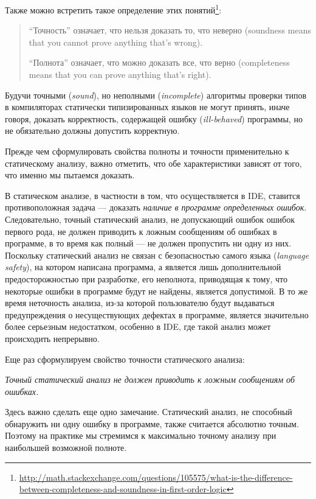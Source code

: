 Также можно встретить такое определение этих
понятий\footnote{\url{http://math.stackexchange.com/questions/105575/what-is-the-difference-between-completeness-and-soundness-in-first-order-logic}}:

\begin{quote}
``Точность'' означает, что нельзя доказать то, что неверно (soundness means that
you cannot prove anything that's wrong).

``Полнота'' означает, что можно доказать все, что верно (completeness means that
you can prove anything that's right).
\end{quote}

Будучи точными (\emph{sound}), но неполными (\emph{incomplete}) алгоритмы
проверки типов в компиляторах статически типизированных языков не
могут принять, иначе говоря, доказать корректность, содержащей ошибку (\emph{ill-behaved})
программы, но не обязательно должны допустить корректную.

Прежде чем сформулировать свойства полноты и точности применительно к
статическому анализу, важно отметить, что обе характеристики зависят от того,
что именно мы пытаемся доказать.

В статическом анализе, в частности в том, что осуществляется в IDE, ставится
противоположная задача --- доказать \emph{наличие в программе определенных
  ошибок}.  Следовательно, точный статический анализ, не допускающий ошибок
ошибок первого рода, не должен приводить к ложным сообщениям об ошибках в программе, в
то время как полный --- не должен пропустить ни одну из них. Поскольку
статический анализ не связан с безопасностью самого языка (\emph{language
  safety}), на котором написана программа, а является лишь дополнительной
предосторожностью при разработке, его неполнота, приводящая к тому, что
некоторые ошибки в программе будут не найдены, является допустимой. В то же
время неточность анализа, из-за которой пользователю будут выдаваться
предупреждения о несуществующих дефектах в программе, является значительно более
серьезным недостатком, особенно в IDE, где такой анализ может происходить
непрерывно.

Еще раз сформулируем свойство точности статического анализа:

\emph{Точный статический анализ не должен приводить к ложным сообщениям об 
ошибках.}

Здесь важно сделать еще одно замечание. Статический анализ, не способный
обнаружить ни одну ошибку в программе, также считается абсолютно точным. Поэтому
на практике мы стремимся к максимально точному анализу при наибольшей возможной
полноте.

